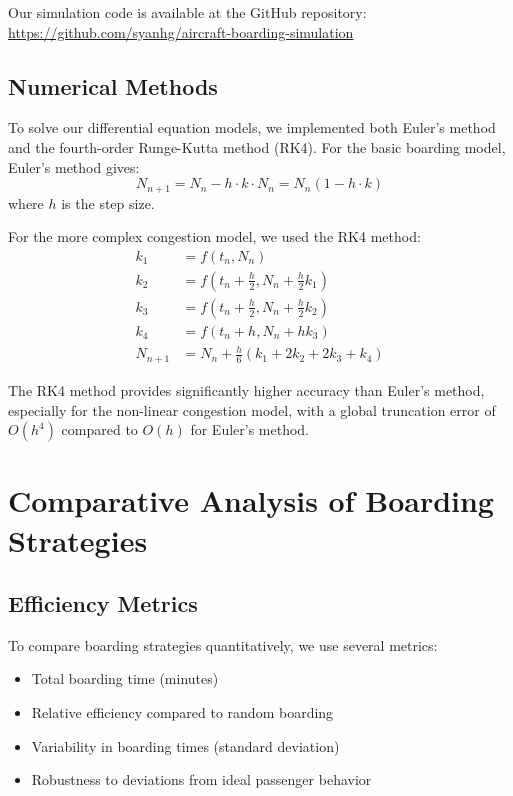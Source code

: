 \documentclass[12pt,a4paper]{article}
\begin{document}
Our simulation code is available at the GitHub repository: \url{https://github.com/syanhg/aircraft-boarding-simulation}

\subsection{Numerical Methods}
To solve our differential equation models, we implemented both Euler's method and the fourth-order Runge-Kutta method (RK4). For the basic boarding model, Euler's method gives:
\begin{equation}
N_{n+1} = N_n - h \cdot k \cdot N_n = N_n (1 - h \cdot k)
\label{eq:euler_boarding}
\end{equation}
where $h$ is the step size.

For the more complex congestion model, we used the RK4 method:
\begin{align}
k_1 &= f(t_n, N_n) \\
k_2 &= f(t_n + \frac{h}{2}, N_n + \frac{h}{2} k_1) \\
k_3 &= f(t_n + \frac{h}{2}, N_n + \frac{h}{2} k_2) \\
k_4 &= f(t_n + h, N_n + h k_3) \\
N_{n+1} &= N_n + \frac{h}{6}(k_1 + 2k_2 + 2k_3 + k_4)
\label{eq:rk4}
\end{align}

The RK4 method provides significantly higher accuracy than Euler's method, especially for the non-linear congestion model, with a global truncation error of $O(h^4)$ compared to $O(h)$ for Euler's method.

\section{Comparative Analysis of Boarding Strategies}

\subsection{Efficiency Metrics}
To compare boarding strategies quantitatively, we use several metrics:
\begin{itemize}
    \item Total boarding time (minutes)
    \item Relative efficiency compared to random boarding
    \item Variability in boarding times (standard deviation)
    \item Robustness to deviations from ideal passenger behavior
\end{itemize}
\end{document}
